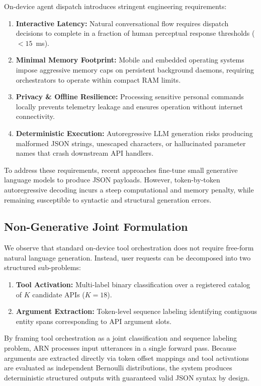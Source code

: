\documentclass[letterpaper]{article}
\begin{document}
On-device agent dispatch introduces stringent engineering requirements:
\begin{enumerate}
    \item \textbf{Interactive Latency:} Natural conversational flow requires dispatch decisions to complete in a fraction of human perceptual response thresholds ($<15$~ms).
    \item \textbf{Minimal Memory Footprint:} Mobile and embedded operating systems impose aggressive memory caps on persistent background daemons, requiring orchestrators to operate within compact RAM limits.
    \item \textbf{Privacy \& Offline Resilience:} Processing sensitive personal commands locally prevents telemetry leakage and ensures operation without internet connectivity.
    \item \textbf{Deterministic Execution:} Autoregressive LLM generation risks producing malformed JSON strings, unescaped characters, or hallucinated parameter names that crash downstream API handlers.
\end{enumerate}

To address these requirements, recent approaches fine-tune small generative language models to produce JSON payloads. However, token-by-token autoregressive decoding incurs a steep computational and memory penalty, while remaining susceptible to syntactic and structural generation errors.

\subsection{Non-Generative Joint Formulation}

We observe that standard on-device tool orchestration does not require free-form natural language generation. Instead, user requests can be decomposed into two structured sub-problems:
\begin{enumerate}
    \item \textbf{Tool Activation:} Multi-label binary classification over a registered catalog of $K$ candidate APIs ($K=18$).
    \item \textbf{Argument Extraction:} Token-level sequence labeling identifying contiguous entity spans corresponding to API argument slots.
\end{enumerate}

By framing tool orchestration as a joint classification and sequence labeling problem, ARN processes input utterances in a single forward pass. Because arguments are extracted directly via token offset mappings and tool activations are evaluated as independent Bernoulli distributions, the system produces deterministic structured outputs with guaranteed valid JSON syntax by design.
\end{document}
